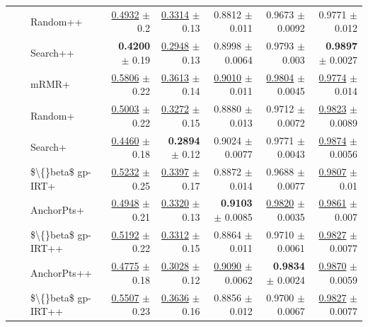 \begin{longtable}{llp{}rrrrr}
 &  & Random++ & \underline{0.4932} {\scriptsize $\pm$ 0.2} & \underline{0.3314} {\scriptsize $\pm$ 0.13} & 0.8812 {\scriptsize $\pm$ 0.011} & 0.9673 {\scriptsize $\pm$ 0.0092} & 0.9771 {\scriptsize $\pm$ 0.012} \\
 &  & Search++ & \textbf{0.4200} {\scriptsize $\pm$ 0.19} & \underline{0.2948} {\scriptsize $\pm$ 0.13} & 0.8998 {\scriptsize $\pm$ 0.0064} & 0.9793 {\scriptsize $\pm$ 0.003} & \textbf{0.9897} {\scriptsize $\pm$ 0.0027} \\
 &  & mRMR+ & \underline{0.5806} {\scriptsize $\pm$ 0.22} & \underline{0.3613} {\scriptsize $\pm$ 0.14} & \underline{0.9010} {\scriptsize $\pm$ 0.011} & \underline{0.9804} {\scriptsize $\pm$ 0.0045} & \underline{0.9774} {\scriptsize $\pm$ 0.014} \\
 &  & Random+ & \underline{0.5003} {\scriptsize $\pm$ 0.22} & \underline{0.3272} {\scriptsize $\pm$ 0.15} & 0.8880 {\scriptsize $\pm$ 0.013} & 0.9712 {\scriptsize $\pm$ 0.0072} & \underline{0.9823} {\scriptsize $\pm$ 0.0089} \\
 &  & Search+ & \underline{0.4460} {\scriptsize $\pm$ 0.18} & \textbf{0.2894} {\scriptsize $\pm$ 0.12} & 0.9024 {\scriptsize $\pm$ 0.0077} & 0.9771 {\scriptsize $\pm$ 0.0043} & \underline{0.9874} {\scriptsize $\pm$ 0.0056} \\
 &  & \$\textbackslash\{\}beta\$ gp-IRT+ & \underline{0.5232} {\scriptsize $\pm$ 0.25} & \underline{0.3397} {\scriptsize $\pm$ 0.17} & 0.8872 {\scriptsize $\pm$ 0.014} & 0.9688 {\scriptsize $\pm$ 0.0077} & \underline{0.9807} {\scriptsize $\pm$ 0.01} \\
 &  & AnchorPts+ & \underline{0.4948} {\scriptsize $\pm$ 0.21} & \underline{0.3320} {\scriptsize $\pm$ 0.13} & \textbf{0.9103} {\scriptsize $\pm$ 0.0085} & \underline{0.9820} {\scriptsize $\pm$ 0.0035} & \underline{0.9861} {\scriptsize $\pm$ 0.007} \\
 &  & \$\textbackslash\{\}beta\$ gp-IRT++ & \underline{0.5192} {\scriptsize $\pm$ 0.22} & \underline{0.3312} {\scriptsize $\pm$ 0.15} & 0.8864 {\scriptsize $\pm$ 0.011} & 0.9710 {\scriptsize $\pm$ 0.0061} & \underline{0.9827} {\scriptsize $\pm$ 0.0077} \\
 &  & AnchorPts++ & \underline{0.4775} {\scriptsize $\pm$ 0.18} & \underline{0.3028} {\scriptsize $\pm$ 0.12} & \underline{0.9090} {\scriptsize $\pm$ 0.0062} & \textbf{0.9834} {\scriptsize $\pm$ 0.0024} & \underline{0.9870} {\scriptsize $\pm$ 0.0059} \\
 &  & \$\textbackslash\{\}beta\$ gp-IRT++ & \underline{0.5507} {\scriptsize $\pm$ 0.23} & \underline{0.3636} {\scriptsize $\pm$ 0.16} & 0.8856 {\scriptsize $\pm$ 0.012} & 0.9700 {\scriptsize $\pm$ 0.0067} & \underline{0.9827} {\scriptsize $\pm$ 0.0077} \\

\end{longtable}
